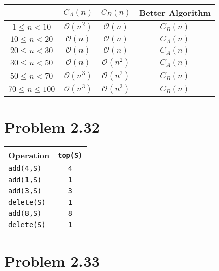 \documentclass[12pt]{article}
\begin{document}
\begin{table}[H]
  \centering
  \begin{tabular}{c|c|c|c}
      \toprule
       & \(C_A (n)\) & \(C_B (n)\) & Better Algorithm  \\
    \midrule
      \(1 \leq n < 10\) & \(\mathcal{O}(n^2)\) & \(\mathcal{O}(n)\) & \(C_B (n)\) \\
      \(10 \leq n < 20\) & \(\mathcal{O}(n)\) & \(\mathcal{O}(n)\) & \(C_A (n)\) \\
      \(20 \leq n < 30\) & \(\mathcal{O}(n)\) & \(\mathcal{O}(n)\) & \(C_A (n)\) \\
      \(30 \leq n < 50\) & \(\mathcal{O}(n)\) & \(\mathcal{O}(n^2)\) & \(C_A (n)\) \\
      \(50 \leq n < 70\) & \(\mathcal{O}(n^3)\) & \(\mathcal{O}(n^2)\) & \(C_B (n)\) \\
      \(70 \leq n \leq 100\) & \(\mathcal{O}(n^3)\) & \(\mathcal{O}(n^3)\) & \(C_B (n)\) \\
      \bottomrule
  \end{tabular}
\end{table}

\section*{Problem 2.32}

\begin{table}[H]
  \centering
  \begin{tabular}{l|c}
      \toprule
      Operation &  \verb|top(S)| \\
    \midrule
      \verb|add(4,S)| & \verb|4|  \\
      \verb|add(1,S)| & \verb|1|  \\
      \verb|add(3,S)| & \verb|3|  \\
      \verb|delete(S)| & \verb|1|  \\
      \verb|add(8,S)| & \verb|8|  \\
      \verb|delete(S)| & \verb|1|  \\
      \bottomrule
  \end{tabular}
\end{table}

\section*{Problem 2.33}
\end{document}
